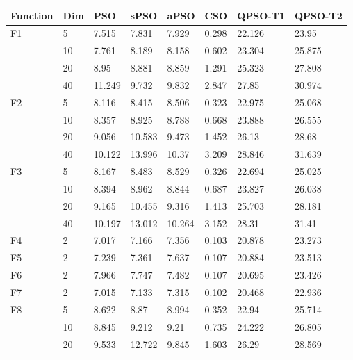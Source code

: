 \begin{longtable}{|l|l|l|l|l|l|l|l|}
\toprule
Function & Dim & PSO     & sPSO   & aPSO    & CSO    & QPSO-T1 & QPSO-T2 \\ \midrule
\endhead
\midrule
\endfoot
F1       & 5   & 7.515   & 7.831  & 7.929   & 0.298  & 22.126  & 23.95   \\ \cmidrule{2-8}
            & 10  & 7.761   & 8.189  & 8.158   & 0.602  & 23.304  & 25.875  \\ \cmidrule{2-8}
            & 20  & 8.95    & 8.881  & 8.859   & 1.291  & 25.323  & 27.808  \\ \cmidrule{2-8}
            & 40  & 11.249  & 9.732  & 9.832   & 2.847  & 27.85   & 30.974  \\ \midrule
F2       & 5   & 8.116   & 8.415  & 8.506   & 0.323  & 22.975  & 25.068  \\ \cmidrule{2-8}
            & 10  & 8.357   & 8.925  & 8.788   & 0.668  & 23.888  & 26.555  \\ \cmidrule{2-8}
            & 20  & 9.056   & 10.583 & 9.473   & 1.452  & 26.13   & 28.68   \\ \cmidrule{2-8}
            & 40  & 10.122  & 13.996 & 10.37   & 3.209  & 28.846  & 31.639  \\ \midrule
F3       & 5   & 8.167   & 8.483  & 8.529   & 0.326  & 22.694  & 25.025  \\ \cmidrule{2-8}
            & 10  & 8.394   & 8.962  & 8.844   & 0.687  & 23.827  & 26.038  \\ \cmidrule{2-8}
            & 20  & 9.165   & 10.455 & 9.316   & 1.413  & 25.703  & 28.181  \\ \cmidrule{2-8}
            & 40  & 10.197  & 13.012 & 10.264  & 3.152  & 28.31   & 31.41   \\ \midrule
F4       & 2   & 7.017   & 7.166  & 7.356   & 0.103  & 20.878  & 23.273  \\ \midrule
F5       & 2   & 7.239   & 7.361  & 7.637   & 0.107  & 20.884  & 23.513  \\ \midrule
F6       & 2   & 7.966   & 7.747  & 7.482   & 0.107  & 20.695  & 23.426  \\ \midrule
F7       & 2   & 7.015   & 7.133  & 7.315   & 0.102  & 20.468  & 22.936  \\ \midrule
F8       & 5   & 8.622   & 8.87   & 8.994   & 0.352  & 22.94   & 25.714  \\ \cmidrule{2-8}
            & 10  & 8.845   & 9.212  & 9.21    & 0.735  & 24.222  & 26.805  \\ \cmidrule{2-8}
            & 20  & 9.533   & 12.722 & 9.845   & 1.603  & 26.29   & 28.569  \\ \cmidrule{2-8}

\end{longtable}
